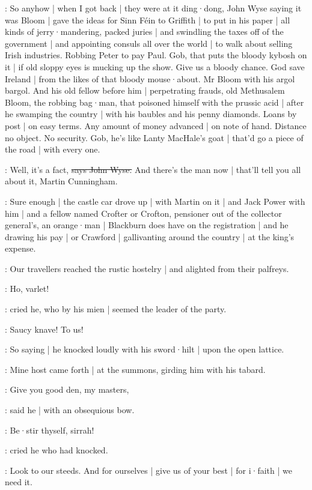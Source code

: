 \Nq:
So anyhow |
when I got back |
they were at it ding·dong,
John Wyse saying it was Bloom |
gave the ideas for Sinn Féin to Griffith |
to put in his paper |
all kinds of jerry·mandering,
packed juries |
and swindling the taxes off of the government |
and appointing consuls all over the world |
to walk about selling Irish industries.
Robbing Peter to pay Paul.
Gob,
that puts the bloody kybosh on it |
if old sloppy eyes is mucking up the show.
Give us a bloody chance.
God save Ireland |
from the likes of that bloody mouse·about.
Mr Bloom with his argol bargol.
And his old fellow before him |
perpetrating frauds,
old Methusalem Bloom,
the robbing bag·man,
that poisoned himself with the prussic acid |
after he swamping the country |
with his baubles and his penny diamonds.
Loans by post |
on easy terms.
Any amount of money advanced |
on note of hand.
Distance no object.
No security.
Gob,
he's like Lanty MacHale's goat |
that'd go a piece of the road |
with every one.

\johnwyse:
Well,
it's a fact,
\sout{says John Wyse.}
And there's the man now |
that'll tell you all about it,
Martin Cunningham.

\Nq:
Sure enough |
the castle car drove up |
with Martin on it |
and Jack Power with him |
and a fellow named Crofter or Crofton,
pensioner out of the collector general's,
an orange·man |
Blackburn does have on the registration |
and he drawing his pay |
or Crawford |
gallivanting around the country |
at the king's expense.

:
Our travellers reached the rustic hostelry |
and alighted from their palfreys.

\cunningham:
Ho,
varlet!

:
cried he,
who by his mien |
seemed the leader of the party.

\cunningham:
Saucy knave!
To us!

:
So saying |
he knocked loudly with his sword·hilt |
upon the open lattice.

:
Mine host came forth |
at the summons,
girding him with his tabard.

\terry:
Give you good den,
my masters,

:
said he |
with an obsequious bow.

\cunningham:
Be·stir thyself,
sirrah!

:
cried he who had knocked.

\cunningham:
Look to our steeds.
And for ourselves |
give us of your best |
for i·faith |
we need it.

